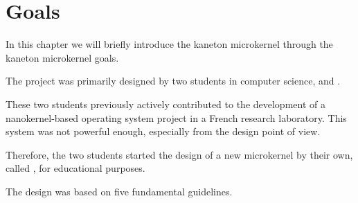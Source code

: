 %
%
%
%
%
%

%
%

\chapter{Goals}
\label{chapter:goals}

In this chapter we will briefly introduce the kaneton microkernel
through the kaneton microkernel goals.

\newpage

%
%

The project was primarily designed by two students in computer science,
 and .

These two students previously actively contributed to the development
of a nanokernel-based operating system project in a French research laboratory.
This system was not powerful enough, especially from the design point of view.

Therefore, the two students started the design of a new microkernel
by their own, called , for educational purposes.

The design was based on five fundamental guidelines.

